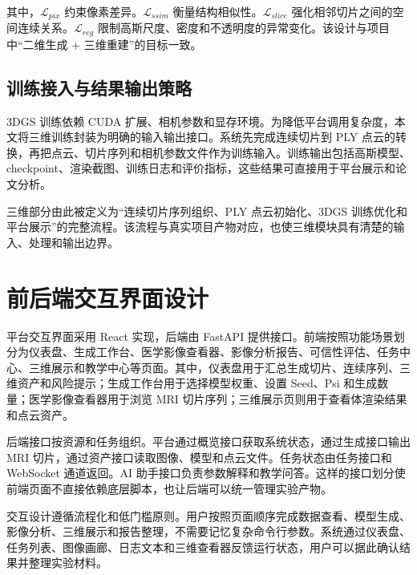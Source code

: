其中，$\mathcal{L}_{pix}$ 约束像素差异。$\mathcal{L}_{ssim}$ 衡量结构相似性。$\mathcal{L}_{slice}$ 强化相邻切片之间的空间连续关系。$\mathcal{L}_{reg}$ 限制高斯尺度、密度和不透明度的异常变化。该设计与项目中“二维生成 + 三维重建”的目标一致。

\subsection{训练接入与结果输出策略}
3DGS 训练依赖 CUDA 扩展、相机参数和显存环境。为降低平台调用复杂度，本文将三维训练封装为明确的输入输出接口。系统先完成连续切片到 PLY 点云的转换，再把点云、切片序列和相机参数文件作为训练输入。训练输出包括高斯模型、checkpoint、渲染截图、训练日志和评价指标，这些结果可直接用于平台展示和论文分析。

三维部分由此被定义为“连续切片序列组织、PLY 点云初始化、3DGS 训练优化和平台展示”的完整流程。该流程与真实项目产物对应，也使三维模块具有清楚的输入、处理和输出边界。

\section{前后端交互界面设计}
平台交互界面采用 React 实现，后端由 FastAPI 提供接口。前端按照功能场景划分为仪表盘、生成工作台、医学影像查看器、影像分析报告、可信性评估、任务中心、三维展示和教学中心等页面。其中，仪表盘用于汇总生成切片、连续序列、三维资产和风险提示；生成工作台用于选择模型权重、设置 Seed、Psi 和生成数量；医学影像查看器用于浏览 MRI 切片序列；三维展示页则用于查看体渲染结果和点云资产。

后端接口按资源和任务组织。平台通过概览接口获取系统状态，通过生成接口输出 MRI 切片，通过资产接口读取图像、模型和点云文件。任务状态由任务接口和 WebSocket 通道返回。AI 助手接口负责参数解释和教学问答。这样的接口划分使前端页面不直接依赖底层脚本，也让后端可以统一管理实验产物。

交互设计遵循流程化和低门槛原则。用户按照页面顺序完成数据查看、模型生成、影像分析、三维展示和报告整理，不需要记忆复杂命令行参数。系统通过仪表盘、任务列表、图像画廊、日志文本和三维查看器反馈运行状态，用户可以据此确认结果并整理实验材料。
